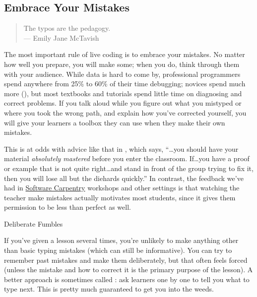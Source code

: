 \subsection*{Embrace Your Mistakes}

\begin{quote}

  The typos are the pedagogy.\\
  --- Emily Jane McTavish

\end{quote}

The most important rule of live coding is to embrace your mistakes.
No matter how well you prepare, you will make some; when you do, think
through them with your audience.  While data is hard to come by,
professional programmers spend anywhere from 25\% to 60\% of their
time debugging; novices spend much more (), but
most textbooks and tutorials spend little time on diagnosing and
correct problems.  If you talk aloud while you figure out what you
mistyped or where you took the wrong path, and explain how you've
corrected yourself, you will give your learners a toolbox they can use
when they make their own mistakes.

This is at odds with advice like that in \cite{Kran2015}, which says,
``{\ldots}you should have your material \emph{absolutely mastered}
before you enter the classroom. If{\ldots}you have a proof or example
that is not quite right{\ldots}and stand in front of the group trying
to fix it, then you will lose all but the diehards quickly.''  In
contrast, the feedback we've had in
\href{http://software-carpentry.org}{Software Carpentry} workshops and
other settings is that watching the teacher make mistakes actually
motivates most students, since it gives them permission to be less
than perfect as well.

\begin{callout}{Deliberate Fumbles}

  If you've given a lesson several times, you're unlikely to make
  anything other than basic typing mistakes (which can still be
  informative). You can try to remember past mistakes and make them
  deliberately, but that often feels forced (unless the mistake and
  how to correct it is the primary purpose of the lesson).  A better
  approach is sometimes called : ask learners one by one to tell you what to type next.
  This is pretty much guaranteed to get you into the weeds.

\end{callout}


